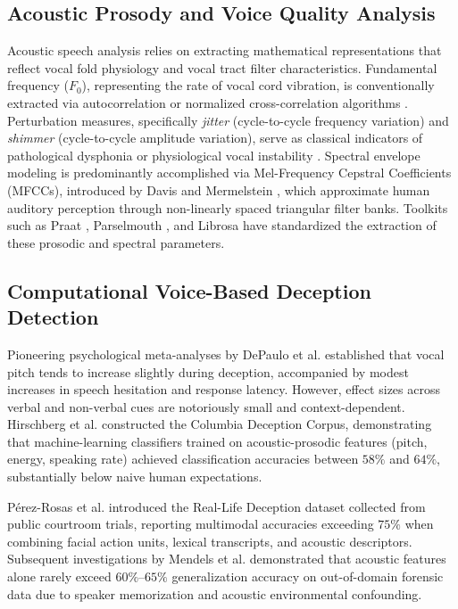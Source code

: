 \documentclass[conference]{IEEEtran}
\begin{document}
\subsection{Acoustic Prosody and Voice Quality Analysis}
Acoustic speech analysis relies on extracting mathematical representations that reflect vocal fold physiology and vocal tract filter characteristics. Fundamental frequency ($F_0$), representing the rate of vocal cord vibration, is conventionally extracted via autocorrelation or normalized cross-correlation algorithms \cite{boersma2001praat}. Perturbation measures, specifically \textit{jitter} (cycle-to-cycle frequency variation) and \textit{shimmer} (cycle-to-cycle amplitude variation), serve as classical indicators of pathological dysphonia or physiological vocal instability \cite{jadoul2018parselmouth}. Spectral envelope modeling is predominantly accomplished via Mel-Frequency Cepstral Coefficients (MFCCs), introduced by Davis and Mermelstein \cite{davis1980comparison}, which approximate human auditory perception through non-linearly spaced triangular filter banks. Toolkits such as Praat \cite{boersma2001praat}, Parselmouth \cite{jadoul2018parselmouth}, and Librosa \cite{mcfee2015librosa} have standardized the extraction of these prosodic and spectral parameters.

\subsection{Computational Voice-Based Deception Detection}
Pioneering psychological meta-analyses by DePaulo et al. \cite{depaulo2003cues} established that vocal pitch tends to increase slightly during deception, accompanied by modest increases in speech hesitation and response latency. However, effect sizes across verbal and non-verbal cues are notoriously small and context-dependent. Hirschberg et al. \cite{hirschberg2005distinguishing} constructed the Columbia Deception Corpus, demonstrating that machine-learning classifiers trained on acoustic-prosodic features (pitch, energy, speaking rate) achieved classification accuracies between $58\%$ and $64\%$, substantially below naive human expectations.

P{\'e}rez-Rosas et al. \cite{perezrosas2015deception} introduced the Real-Life Deception dataset collected from public courtroom trials, reporting multimodal accuracies exceeding $75\%$ when combining facial action units, lexical transcripts, and acoustic descriptors. Subsequent investigations by Mendels et al. \cite{mendels2017hybrid} demonstrated that acoustic features alone rarely exceed $60\%$--$65\%$ generalization accuracy on out-of-domain forensic data due to speaker memorization and acoustic environmental confounding.
\end{document}
